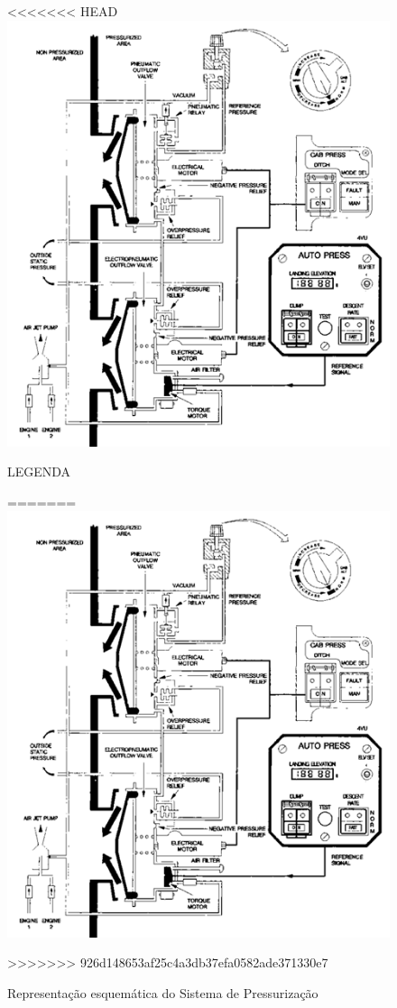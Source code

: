 \begin{figure}
<<<<<<< HEAD
\centering
\includegraphics{images/parte3/sistemas_pressurizacao.png}
\caption{LEGENDA}
=======
\includegraphics[width=\textwidth]{images/parte3/sistemas_pressurizacao.png}
\caption{Representação esquemática do Sistema de Pressurização}
>>>>>>> 926d148653af25c4a3db37efa0582ade371330e7
\label{fig:sistemas_pressurizacao}
\end{figure}


